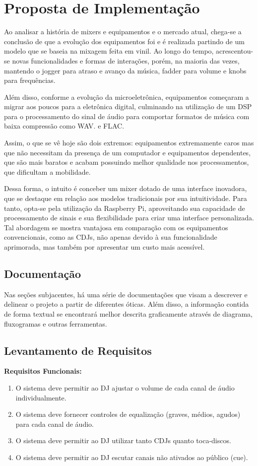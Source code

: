 \newpage
\section{Proposta de Implementação}

Ao analisar a história de mixers e equipamentos e o mercado atual, chega-se a conclusão de que a evolução dos equipamentos foi e é realizada partindo de um modelo que se baseia na mixagem feita em vinil. Ao longo do tempo, acrescentou-se novas funcionalidades e formas de interações, porém, na maioria das vezes, mantendo o jogger para atraso e avanço da música, fadder para volume e knobs para frequências.
\par
Além disso, conforme a evolução da microeletrônica, equipamentos começaram a migrar aos poucos para a eletrônica digital, culminando na utilização de um DSP para o processamento do sinal de áudio para comportar formatos de música com baixa compressão como WAV. e FLAC. 
\par
Assim, o que se vê hoje são dois extremos: equipamentos extremamente caros mas que não necessitam da presença de um computador e equipamentos dependentes, que são mais baratos e acabam possuindo melhor qualidade nos processamentos, que dificultam a mobilidade.
\par
Dessa forma, o intuito é conceber um mixer dotado de uma interface inovadora, que se destaque em relação aos modelos tradicionais por sua intuitividade. Para tanto, opta-se pela utilização da Raspberry Pi, aproveitando sua capacidade de processamento de sinais e sua flexibilidade para criar uma interface personalizada. Tal abordagem se mostra vantajosa em comparação com os equipamentos convencionais, como as CDJs, não apenas devido à sua funcionalidade aprimorada, mas também por apresentar um custo mais acessível.

\subsection{Documentação}
Nas seções subjacentes, há uma série de documentações que visam a descrever e delinear o projeto a partir de diferentes óticas. Além disso, a informação contida de forma textual se encontrará melhor descrita graficamente através de diagrama, fluxogramas e outras ferramentas.

\subsection{Levantamento de Requisitos}
\textbf{Requisitos Funcionais:}
\begin{enumerate}[label=\textbullet]
\item O sistema deve permitir ao DJ ajustar o volume de cada canal de áudio individualmente.
\item O sistema deve fornecer controles de equalização (graves, médios, agudos) para cada canal de áudio.
\item O sistema deve permitir ao DJ utilizar tanto CDJs quanto toca-discos.
\item O sistema deve permitir ao DJ escutar canais não ativados ao público (cue).

\end{enumerate}

